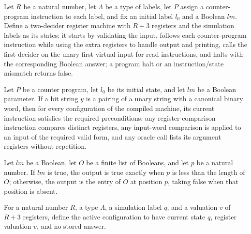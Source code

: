 \begin{definition}
\label{Complexity.CPSim.A}
\leanok
{}
Let $R$ be a natural number, let $\Lambda$ be a type of labels, let $P$ assign a
counter-program instruction to each label, and fix an initial label $l_0$ and a Boolean
$lm$. Define a two-decider register machine with $R+3$ registers and the simulation
labels as its states: it starts by validating the input, follows each counter-program
instruction while using the extra registers to handle output and printing, calls the
first decider on the unary-first virtual input for read instructions, and halts with the
corresponding Boolean answer; a program halt or an instruction/state mismatch returns
false.
\end{definition}

\begin{lemma}
\label{Complexity.CPSim.preS_A}
\leanok
{}
Let $P$ be a counter program, let $l_0$ be its initial state, and let $lm$ be a Boolean
parameter. If a bit string $y$ is a pairing of a unary string with a canonical binary
word, then for every configuration of the compiled machine, its current instruction
satisfies the required preconditions: any register-comparison instruction compares
distinct registers, any input-word comparison is applied to an input of the required
valid form, and any oracle call lists its argument registers without repetition.
\end{lemma}

\begin{definition}
\label{Complexity.CPSim.ans}
\leanok
Let $lm$ be a Boolean, let $O$ be a finite list of Booleans, and let $p$ be a natural
number. If $lm$ is true, the output is true exactly when $p$ is less than the length of
$O$; otherwise, the output is the entry of $O$ at position $p$, taking false when that
position is absent.
\end{definition}

\begin{definition}
\label{Complexity.CPSim.cf}
\leanok
{}
For a natural number $R$, a type $\Lambda$, a simulation label $q$, and a valuation $v$
of $R+3$ registers, define the active configuration to have current state $q$, register
valuation $v$, and no stored answer.
\end{definition}

